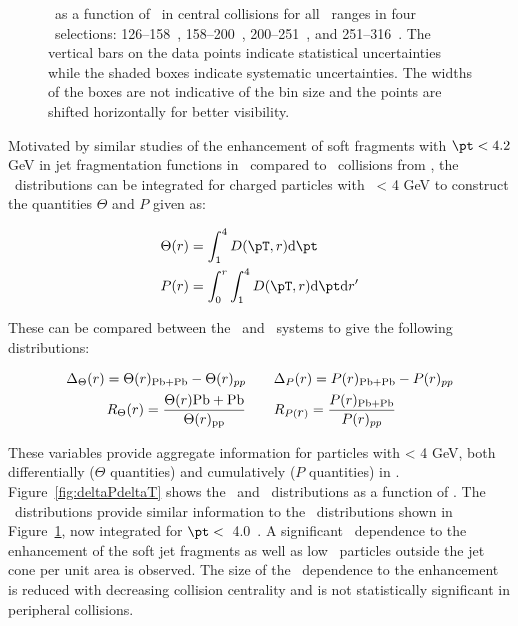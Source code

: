 \begin{figure}
   \caption{\DeltaDptr\ as a function of \rvar\ in central collisions for all \pt\ ranges in four \ptjet\ selections: 126--158~\GeV, 158--200~\GeV, 200--251~\GeV, and 251--316~\GeV. The vertical bars on the data points indicate statistical uncertainties while the shaded boxes indicate systematic uncertainties. The widths of the boxes are not indicative of the bin size and the points are shifted horizontally for better visibility. }
      \label{fig:deltadptr}
\end{figure}

Motivated by similar studies of the enhancement of soft fragments with $\pt < 4.2$ GeV in jet fragmentation functions in \pbpb\ compared to \pp\ collisions from \cite{PhysRevC.98.024908}, the \Dptr\ distributions can be integrated for charged particles with \pt\ < 4 GeV to construct the quantities $\Theta$ and $P$ given as:

\begin{align}
   \Theta(\rvar) &= \int_1^{4} \Dptr  \fd \pt \\
   P(\rvar) &= \int_0^r \int_1^{4} \Dptr \fd \pt \fd r'
\end{align}

These can be compared between the \pp\ and \pbpb\ systems to give the following distributions:

\begin{align}
 \Delta_\Theta(\mbox{$r$}) = \Theta(\mbox{$r$})_{\mathrm{Pb+Pb}} - \Theta(\mbox{$r$})_{pp} & \qquad \Delta_P(\mbox{$r$}) = P(\mbox{$r$})_{\mathrm{Pb+Pb}} - P(\mbox{$r$})_{pp} \\
   R_\Theta(\mbox{$r$}) = \frac{\Theta(\mbox{$r$}){\mathrm{Pb+Pb}}}{\Theta(\mbox{$r$})_{\mathrm{pp}}} &  \qquad R_{P(\mbox{$r$})} = \frac{P(\mbox{$r$})_{\mathrm{Pb+Pb}}}{P(\mbox{$r$})_{pp}}
\end{align}

These variables provide aggregate information for particles with \pt < 4 GeV, both differentially ($\Theta$ quantities)
and cumulatively ($P$ quantities) in \rvar.
Figure~\ref{fig:deltaPdeltaT} shows the \DeltaTheta\ and \DeltaP\ distributions as a function of \rvar. 
The \DeltaTheta\ distributions provide similar information to the \DeltaDptr\ distributions shown in Figure~\ref{fig:deltadptr},
now integrated for $\pt <$~4.0~\GeV.  
A significant \ptjet\ dependence to the enhancement of the soft jet fragments as well as low \pt\ particles outside the jet cone per unit area is observed.
The size of the \ptjet\ dependence to the enhancement is reduced with decreasing collision centrality and is not statistically significant in peripheral collisions.

